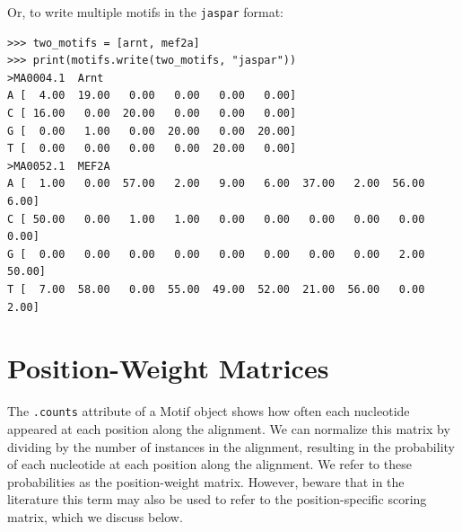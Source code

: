 \documentclass{report}
\begin{document}
Or, to write multiple motifs in the \verb+jaspar+ format:
\begin{verbatim}
>>> two_motifs = [arnt, mef2a]
>>> print(motifs.write(two_motifs, "jaspar"))
>MA0004.1  Arnt
A [  4.00  19.00   0.00   0.00   0.00   0.00]
C [ 16.00   0.00  20.00   0.00   0.00   0.00]
G [  0.00   1.00   0.00  20.00   0.00  20.00]
T [  0.00   0.00   0.00   0.00  20.00   0.00]
>MA0052.1  MEF2A
A [  1.00   0.00  57.00   2.00   9.00   6.00  37.00   2.00  56.00   6.00]
C [ 50.00   0.00   1.00   1.00   0.00   0.00   0.00   0.00   0.00   0.00]
G [  0.00   0.00   0.00   0.00   0.00   0.00   0.00   0.00   2.00  50.00]
T [  7.00  58.00   0.00  55.00  49.00  52.00  21.00  56.00   0.00   2.00]
\end{verbatim}

\section{Position-Weight Matrices}

The \verb+.counts+ attribute of a Motif object shows how often each
nucleotide appeared at each position along the alignment. We can
normalize this matrix by dividing by the number of instances in the
alignment, resulting in the probability of each nucleotide at each
position along the alignment. We refer to these probabilities as
the position-weight matrix. However, beware that in the literature
this term may also be used to refer to the position-specific scoring
matrix, which we discuss below.
\end{document}
